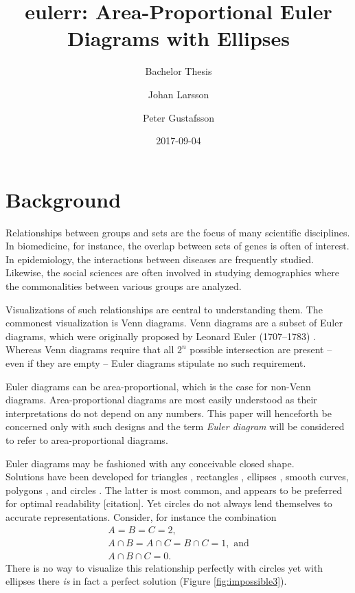 \documentclass[
  headsepline=true,headings=standardclasses%
]{scrartcl}
\title{eulerr: Area-Proportional Euler Diagrams with Ellipses}
\subtitle{Bachelor Thesis}
\author[]{Johan Larsson}
\author[]{Peter Gustafsson}
\affil[]{Lund University}
\date{2017-09-04}
\theoremstyle{definition}
\theoremstyle{definition}
\theoremstyle{definition}
\theoremstyle{remark}
\begin{document}
\maketitle



\hypersetup{linkcolor=black}
\setcounter{tocdepth}{2}
\tableofcontents



\section{Background}\label{background}

Relationships between groups and sets are the focus of many scientific
disciplines. In biomedicine, for instance, the overlap between sets of
genes is often of interest. In epidemiology, the interactions between
diseases are frequently studied. Likewise, the social sciences are often
involved in studying demographics where the commonalities between
various groups are analyzed.

Visualizations of such relationships are central to understanding them.
The commonest visualization is Venn diagrams. Venn diagrams are a subset
of Euler diagrams, which were originally proposed by Leonard Euler
(1707--1783) \autocite{euler_1802}. Whereas Venn diagrams require that
all \(2^n\) possible intersection are present -- even if they are empty
-- Euler diagrams stipulate no such requirement.

Euler diagrams can be area-proportional, which is the case for non-Venn
diagrams. Area-proportional diagrams are most easily understood as their
interpretations do not depend on any numbers. This paper will henceforth
be concerned only with such designs and the term \emph{Euler diagram}
will be considered to refer to area-proportional diagrams.

Euler diagrams may be fashioned with any conceivable closed shape.\\
Solutions have been developed for triangles \autocite{swinton_2011},
rectangles \autocite{swinton_2011}, ellipses \autocite{micallef_2014},
smooth curves, polygons \autocite{swinton_2011}, and circles
\autocites{wilkinson_2012}{kestler_2008}{swinton_2011}. The latter is
most common, and appears to be preferred for optimal readability
{[}citation{]}. Yet circles do not always lend themselves to accurate
representations. Consider, for instance the combination \[
\begin{gathered}
A = B = C = 2,\\
A \cap B = A \cap C = B \cap C = 1, \text{ and}\\
A \cap B \cap C = 0.
\end{gathered}
\] There is no way to visualize this relationship perfectly with circles
yet with ellipses there \emph{is} in fact a perfect solution (Figure
\ref{fig:impossible3}).
\end{document}

